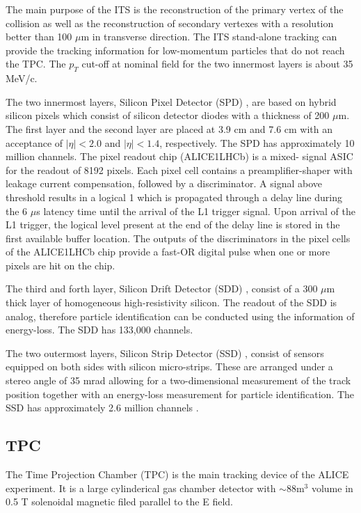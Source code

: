 The main purpose of the ITS is the reconstruction of the primary vertex of the collision as well as the reconstruction of secondary vertexes with a resolution better than 100 $\mu$m in transverse direction. The ITS stand-alone tracking can provide the tracking information for low-momentum particles that do not reach the TPC. The $p_T$ cut-off at nominal field for the two innermost layers is about 35 MeV/c.

The two innermost layers, Silicon Pixel Detector (SPD) \cite{Meddi200140}, are based on hybrid silicon pixels which consist of silicon detector diodes with a thickness of 200 $\mu$m. The first layer and the second layer are placed at 3.9 cm and 7.6 cm with an acceptance of $|\eta| < 2.0$ and $|\eta| < 1.4$, respectively. The SPD has approximately 10 million channels. The pixel readout chip (ALICE1LHCb) is a mixed- signal ASIC for the readout of 8192 pixels. Each pixel cell contains a preamplifier-shaper with leakage current compensation, followed by a discriminator. A signal above threshold results in a logical 1 which is propagated through a delay line during the 6 $\mu$s latency time until the arrival of the L1 trigger signal. Upon arrival of the L1 trigger, the logical level present at the end of the delay line is stored in the first available buffer location. The outputs of the discriminators in the pixel cells of the ALICE1LHCb chip provide a fast-OR digital pulse when one or more pixels are hit on the chip. 

The third and forth layer, Silicon Drift Detector (SDD) \cite{Alessandro:2010rq}, consist of a 300 $\mu$m thick layer of homogeneous high-resistivity silicon. The readout of the SDD is analog, therefore particle identification can be conducted using the information of energy-loss. The SDD has 133,000 channels.

The two outermost layers, Silicon Strip Detector (SSD) \cite{Contin:2011rs}, consist of sensors equipped on both sides with silicon micro-strips. These are arranged under a stereo angle of 35 mrad allowing for a two-dimensional measurement of the track position together with an energy-loss measurement for particle identification. The SSD has approximately 2.6 million channels \cite{Contin:2009lza}.



\subsection{TPC}

The Time Projection Chamber (TPC) \cite{CERN-LHCC-2013-020} is the main tracking device of the ALICE experiment. It is a large cylinderical gas chamber detector with $\sim 88$m$^3$ volume in 0.5 T solenoidal magnetic filed parallel to the E field. 


